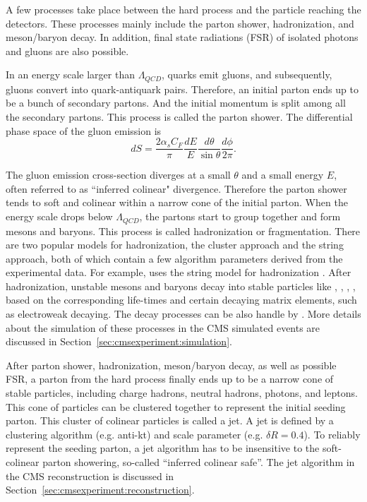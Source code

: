 A few processes take place between the hard process and the particle reaching the detectors. These processes mainly include the parton shower, hadronization, and meson/baryon decay. In addition, final state radiations (FSR) of isolated photons and gluons are also possible.

In an energy scale larger than $\Lambda_{QCD}$, quarks emit gluons, and subsequently, gluons convert into quark-antiquark pairs. Therefore, an initial parton ends up to be a bunch of secondary partons. And the initial momentum is split among all the secondary partons. This process is called the parton shower. The differential phase space of the gluon emission is
\begin{equation}
    dS = \frac{2\alpha_s C_F}{\pi} \frac{dE}{E}\frac{d\theta}{\sin \theta} \frac{d\phi}{2\pi}.
\end{equation}

\noindent The gluon emission cross-section diverges at a small $\theta$ and a small energy $E$, often referred to as ``inferred colinear" divergence. Therefore the parton shower tends to soft and colinear within a narrow cone of the initial parton. 
When the energy scale drops below $\Lambda_{QCD}$, the partons start to group together and form mesons and baryons. This process is called hadronization or fragmentation. There are two popular models for hadronization, the cluster approach and the string approach, both of which contain a few algorithm parameters derived from the experimental data. For example, \PYTHIA uses the string model for hadronization \cite{ANDERSSON198331}. After hadronization, unstable mesons and baryons decay into stable particles like \PGp, \PK, \PGg, \Pe, \PGm based on the corresponding life-times and certain decaying matrix elements, such as electroweak decaying. The decay processes can be also handle by \PYTHIA. More details about the simulation of these processes in the CMS simulated events are discussed in Section~\ref{sec:cmsexperiment:simulation}.

After parton shower, hadronization, meson/baryon decay, as well as possible FSR, a parton from the hard process finally ends up to be a narrow cone of stable particles, including charge hadrons, neutral hadrons, photons, and leptons. This cone of particles can be clustered together to represent the initial seeding parton. This cluster of colinear particles is called a jet. A jet is defined by a clustering algorithm (e.g. anti-kt) and scale parameter (e.g. $\delta R=0.4$). To reliably represent the seeding parton, a jet algorithm has to be insensitive to the soft-colinear parton showering, so-called ``inferred colinear safe''. The jet algorithm in the CMS reconstruction is discussed in Section~\ref{sec:cmsexperiment:reconstruction}.

